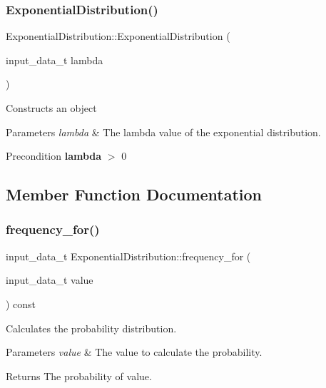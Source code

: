 \subsubsection{\texorpdfstring{Exponential\+Distribution()}{ExponentialDistribution()}}
{\footnotesize\ttfamily Exponential\+Distribution\+::\+Exponential\+Distribution (\begin{DoxyParamCaption}\item[{input\+\_\+data\+\_\+t}]{lambda }\end{DoxyParamCaption})\hspace{0.3cm}{\ttfamily [inline]}}

Constructs an object 
\begin{DoxyParams}{Parameters}
{\em lambda} & The lambda value of the exponential distribution. \\
\hline
\end{DoxyParams}
\begin{DoxyPrecond}{Precondition}
{\bfseries lambda} $>$ 0 
\end{DoxyPrecond}


\subsection{Member Function Documentation}
\mbox{\label{classExponentialDistribution_a1bf7a6f5d124a053934654af1e70f9bc}} 
\subsubsection{\texorpdfstring{frequency\+\_\+for()}{frequency\_for()}}
{\footnotesize\ttfamily input\+\_\+data\+\_\+t Exponential\+Distribution\+::frequency\+\_\+for (\begin{DoxyParamCaption}\item[{input\+\_\+data\+\_\+t}]{value }\end{DoxyParamCaption}) const\hspace{0.3cm}{\ttfamily [virtual]}}

Calculates the probability distribution. 
\begin{DoxyParams}{Parameters}
{\em value} & The value to calculate the probability. \\
\hline
\end{DoxyParams}
\begin{DoxyReturn}{Returns}
The probability of value. 
\end{DoxyReturn}


